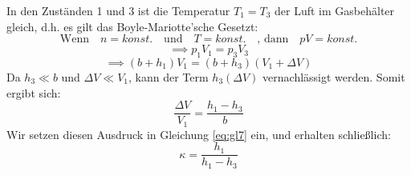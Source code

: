 \documentclass[a4paper,10pt]{article}
\begin{document}
In den Zuständen 1 und 3 ist die Temperatur \(T_1=T_3\) der Luft im Gasbehälter gleich, d.h. es gilt das Boyle-Mariotte'sche Gesetzt:
\begin{equation} 
  \text{Wenn}\quad n= konst.\quad \text{und} \quad T=konst.  \quad \text{, dann}\quad  pV=konst.
\end{equation}
\begin{equation} 
  \implies p_1 V_1 = p_3 V_3
\end{equation}
\begin{equation} 
  \implies \left(b+h_1\right) V_1 = \left(b+h_3\right) \left(V_1 + \Delta V\right)
\end{equation}
Da \(h_3 \ll b\) und \(\Delta V \ll V_1\), kann der Term \(h_3 \left(\Delta V\right)\) vernachlässigt werden. Somit
ergibt sich:
\begin{equation}
  \frac{\Delta V}{V_1}= \frac{h_1 - h_3}{b}
\end{equation}
Wir setzen diesen Ausdruck in Gleichung \eqref{eq:gl7} ein, und erhalten schließlich:
\begin{equation} \label{eq:kappa_1}
  \boxed{\kappa = \frac{h_1}{h_1-h_3} }
\end{equation}
\end{document}
